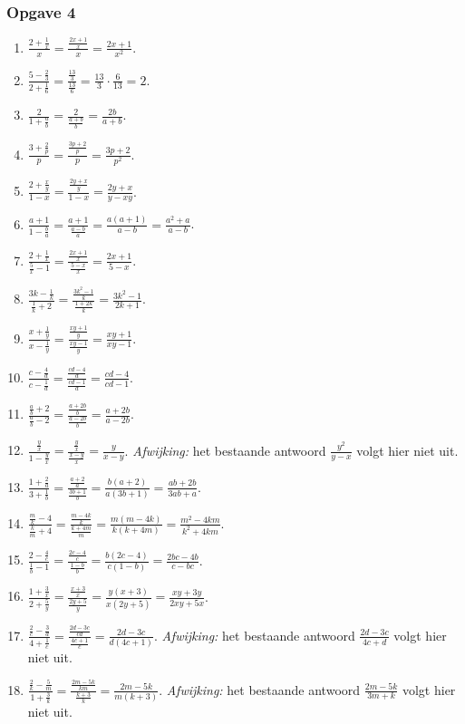 \subsubsection*{Opgave 4}
\begin{enumerate}[label=\alph*)]
\item $\frac{2+\frac{1}{x}}{x}=\frac{\frac{2x+1}{x}}{x}=\frac{2x+1}{x^2}$.
\item $\frac{5-\frac{2}{3}}{2+\frac{1}{6}}=\frac{\frac{13}{3}}{\frac{13}{6}}=\frac{13}{3}\cdot\frac{6}{13}=2$.
\item $\frac{2}{1+\frac{a}{b}}=\frac{2}{\frac{a+b}{b}}=\frac{2b}{a+b}$.
\item $\frac{3+\frac{2}{p}}{p}=\frac{\frac{3p+2}{p}}{p}=\frac{3p+2}{p^2}$.
\item $\frac{2+\frac{x}{y}}{1-x}=\frac{\frac{2y+x}{y}}{1-x}=\frac{2y+x}{y-xy}$.
\item $\frac{a+1}{1-\frac{b}{a}}=\frac{a+1}{\frac{a-b}{a}}=\frac{a(a+1)}{a-b}=\frac{a^2+a}{a-b}$.
\item $\frac{2+\frac{1}{x}}{\frac{5}{x}-1}=\frac{\frac{2x+1}{x}}{\frac{5-x}{x}}=\frac{2x+1}{5-x}$.
\item $\frac{3k-\frac{1}{k}}{\frac{1}{k}+2}=\frac{\frac{3k^2-1}{k}}{\frac{1+2k}{k}}=\frac{3k^2-1}{2k+1}$.
\item $\frac{x+\frac{1}{y}}{x-\frac{1}{y}}=\frac{\frac{xy+1}{y}}{\frac{xy-1}{y}}=\frac{xy+1}{xy-1}$.
\item $\frac{c-\frac{4}{d}}{c-\frac{1}{d}}=\frac{\frac{cd-4}{d}}{\frac{cd-1}{d}}=\frac{cd-4}{cd-1}$.
\item $\frac{\frac{a}{b}+2}{\frac{a}{b}-2}=\frac{\frac{a+2b}{b}}{\frac{a-2b}{b}}=\frac{a+2b}{a-2b}$.
\item $\frac{\frac{y}{x}}{1-\frac{y}{x}}=\frac{\frac{y}{x}}{\frac{x-y}{x}}=\frac{y}{x-y}$. \emph{Afwijking:} het bestaande antwoord $\frac{y^2}{y-x}$ volgt hier niet uit.
\item $\frac{1+\frac{2}{a}}{3+\frac{1}{b}}=\frac{\frac{a+2}{a}}{\frac{3b+1}{b}}=\frac{b(a+2)}{a(3b+1)}=\frac{ab+2b}{3ab+a}$.
\item $\frac{\frac{m}{k}-4}{\frac{k}{m}+4}=\frac{\frac{m-4k}{k}}{\frac{k+4m}{m}}=\frac{m(m-4k)}{k(k+4m)}=\frac{m^2-4km}{k^2+4km}$.
\item $\frac{2-\frac{4}{c}}{\frac{1}{b}-1}=\frac{\frac{2c-4}{c}}{\frac{1-b}{b}}=\frac{b(2c-4)}{c(1-b)}=\frac{2bc-4b}{c-bc}$.
\item $\frac{1+\frac{3}{x}}{2+\frac{5}{y}}=\frac{\frac{x+3}{x}}{\frac{2y+5}{y}}=\frac{y(x+3)}{x(2y+5)}=\frac{xy+3y}{2xy+5x}$.
\item $\frac{\frac{2}{c}-\frac{3}{d}}{4+\frac{1}{c}}=\frac{\frac{2d-3c}{cd}}{\frac{4c+1}{c}}=\frac{2d-3c}{d(4c+1)}$. \emph{Afwijking:} het bestaande antwoord $\frac{2d-3c}{4c+d}$ volgt hier niet uit.
\item $\frac{\frac{2}{k}-\frac{5}{m}}{1+\frac{3}{k}}=\frac{\frac{2m-5k}{km}}{\frac{k+3}{k}}=\frac{2m-5k}{m(k+3)}$. \emph{Afwijking:} het bestaande antwoord $\frac{2m-5k}{3m+k}$ volgt hier niet uit.
\end{enumerate}

